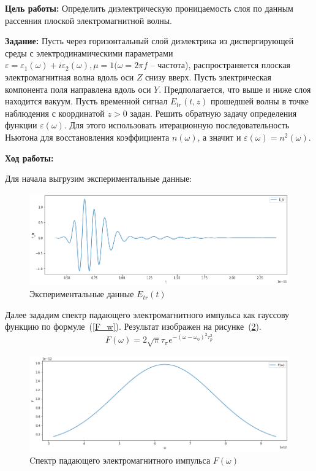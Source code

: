 \justifying
\textbf{Цель работы:}
Определить диэлектрическую проницаемость слоя по данным рассеяния плоской электромагнитной волны.

\textbf{Задание:}
Пусть через горизонтальный слой диэлектрика из диспергирующей среды с электродинамическими параметрами $\varepsilon = \varepsilon_1(\omega) + i \varepsilon_2(\omega), \mu = 1 (\omega = 2 \pi f$ -- частота), распространяется плоская электромагнитная волна вдоль оси $Z$ снизу вверх. Пусть электрическая компонента поля направлена вдоль оси $Y$. Предполагается, что выше и ниже слоя находится вакуум. Пусть временной сигнал $E_{tr}(t, z)$ прошедшей волны в точке наблюдения с координатой $z > 0$ задан. Решить обратную задачу определения функции $\varepsilon(\omega)$. Для этого использовать итерационную последовательность Ньютона для восстановления коэффициента $n(\omega)$, а значит и $\varepsilon(\omega) = n ^ 2(\omega)$.

\textbf{Ход работы:}

Для начала выгрузим экспериментальные данные:
\begin{figure}[hb!]
    \centering
    \includegraphics[width=\linewidth]{Figures/Experimental_data.png}
    \caption{Экспериментальные данные $E_{tr}(t)$}
    \label{fig:exp_data}
\end{figure}

Далее зададим спектр падающего электромагнитного импульса как гауссову функцию по формуле~(\ref{F_w}). Результат изображен на рисунке~(\ref{fig:F_w}).
\begin{equation}\label{F_w}
    F(\omega) = 2 \sqrt{\pi} \tau_{\pi} e ^ {-(\omega - \omega_0)^2 \tau_p^2}
\end{equation}

\begin{figure}[h!]
    \centering
    \includegraphics[width=\linewidth]{Figures/F_w.png}
    \caption{Cпектр падающего электромагнитного импульса $F(\omega)$}
    \label{fig:F_w}
\end{figure}

